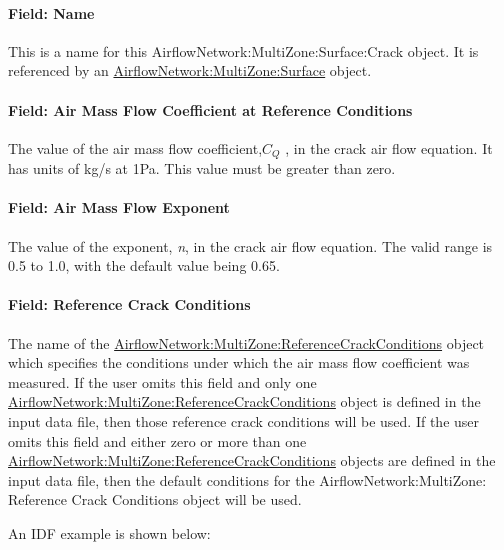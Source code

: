 \paragraph{Field: Name}\label{field-name-2-003}

This is a name for this AirflowNetwork:MultiZone:Surface:Crack object. It is referenced by an \hyperref[airflownetworkmultizonesurface]{AirflowNetwork:MultiZone:Surface} object.

\paragraph{Field: Air Mass Flow Coefficient at Reference Conditions}\label{field-air-mass-flow-coefficient-at-reference-conditions}

The value of the air mass flow coefficient,\({C_Q}\) , in the crack air flow equation. It has units of kg/s at 1Pa. This value must be greater than zero.

\paragraph{Field: Air Mass Flow Exponent}\label{field-air-mass-flow-exponent}

The value of the exponent, \emph{n}, in the crack air flow equation. The valid range is 0.5 to 1.0, with the default value being 0.65.

\paragraph{Field: Reference Crack Conditions}\label{field-reference-crack-conditions}

The name of the \hyperref[airflownetworkmultizonereferencecrackconditions]{AirflowNetwork:MultiZone:ReferenceCrackConditions} object which specifies the conditions under which the air mass flow coefficient was measured. If the user omits this field and only one \hyperref[airflownetworkmultizonereferencecrackconditions]{AirflowNetwork:MultiZone:ReferenceCrackConditions} object is defined in the input data file, then those reference crack conditions will be used. If the user omits this field and either zero or more than one \hyperref[airflownetworkmultizonereferencecrackconditions]{AirflowNetwork:MultiZone:ReferenceCrackConditions} objects are defined in the input data file, then the default conditions for the AirflowNetwork:MultiZone: Reference Crack Conditions object will be used.

An IDF example is shown below:

